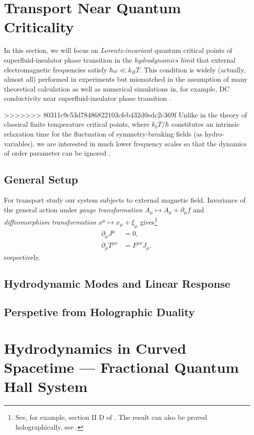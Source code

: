 \documentclass[10pt,nofootinbib,letterpaper]{revtex4}
\begin{document}
\section{Transport Near Quantum Criticality}
	In this section, we will focus on \emph{Lorentz-invariant} quantum critical points of superfluid-insulator phase transition in the \emph{hydrodynamics limit} that external electromagnetic frequencies satisfy $\hbar\omega\ll k_B T$. This condition is widely (actually, almost all) performed in experiments but mismatched in the assumption of many theoretical calculation as well as numerical simulations in, for example, DC conductivity near superfluid-insulator phase transition \cite{damle1997nonzero}.\par
>>>>>>> 80311c9c53d78486822103cfeb432d0edc2c369f
	Unlike in the theory of classical finite temperature critical points, where $k_bT/\hbar$ constitutes an intrinsic relaxation time for the fluctuation of symmetry-breaking fields (as hydro-variables), we are interested in much lower frequency scales so that the dynamics of order parameter can be ignored \cite{hartnoll2007theory}.

	\subsection{General Setup}

		For transport study our system subjects to external magnetic field. Invariance of the general action under \emph{gauge transformation} $A_\mu\mapsto A_\mu+\partial_\mu f$ and \emph{diffeomorphism transformation} $x^\mu\mapsto x_\mu+\xi_\mu$ gives\footnote{See, for example, section II D of \cite{herzog2009lectures}. The result can also be proved holographically, see \cite{lindgren2015holographic}.}
		\begin{align}\label{5.1.1}
			\partial_\mu J^\mu&=0,\\
			\partial_\mu T^{\mu\nu}&=F^{\mu\nu}J_\mu,
		\end{align}
		respectively.
		
	\subsection{Hydrodynamic Modes and Linear Response}
	\subsection{Perspetive from Holographic Duality}

\section{Hydrodynamics in Curved Spacetime --- Fractional Quantum Hall System}
\end{document}
